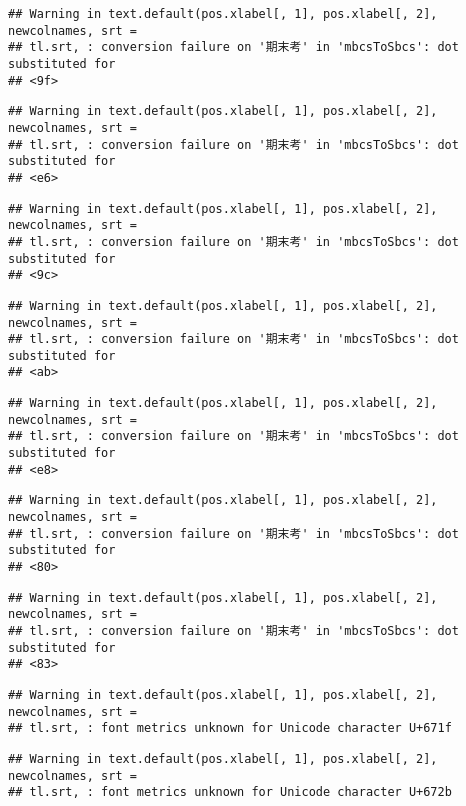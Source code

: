 \documentclass[
]{book}
\begin{document}
\begin{verbatim}
## Warning in text.default(pos.xlabel[, 1], pos.xlabel[, 2], newcolnames, srt =
## tl.srt, : conversion failure on '期末考' in 'mbcsToSbcs': dot substituted for
## <9f>
\end{verbatim}

\begin{verbatim}
## Warning in text.default(pos.xlabel[, 1], pos.xlabel[, 2], newcolnames, srt =
## tl.srt, : conversion failure on '期末考' in 'mbcsToSbcs': dot substituted for
## <e6>
\end{verbatim}

\begin{verbatim}
## Warning in text.default(pos.xlabel[, 1], pos.xlabel[, 2], newcolnames, srt =
## tl.srt, : conversion failure on '期末考' in 'mbcsToSbcs': dot substituted for
## <9c>
\end{verbatim}

\begin{verbatim}
## Warning in text.default(pos.xlabel[, 1], pos.xlabel[, 2], newcolnames, srt =
## tl.srt, : conversion failure on '期末考' in 'mbcsToSbcs': dot substituted for
## <ab>
\end{verbatim}

\begin{verbatim}
## Warning in text.default(pos.xlabel[, 1], pos.xlabel[, 2], newcolnames, srt =
## tl.srt, : conversion failure on '期末考' in 'mbcsToSbcs': dot substituted for
## <e8>
\end{verbatim}

\begin{verbatim}
## Warning in text.default(pos.xlabel[, 1], pos.xlabel[, 2], newcolnames, srt =
## tl.srt, : conversion failure on '期末考' in 'mbcsToSbcs': dot substituted for
## <80>
\end{verbatim}

\begin{verbatim}
## Warning in text.default(pos.xlabel[, 1], pos.xlabel[, 2], newcolnames, srt =
## tl.srt, : conversion failure on '期末考' in 'mbcsToSbcs': dot substituted for
## <83>
\end{verbatim}

\begin{verbatim}
## Warning in text.default(pos.xlabel[, 1], pos.xlabel[, 2], newcolnames, srt =
## tl.srt, : font metrics unknown for Unicode character U+671f
\end{verbatim}

\begin{verbatim}
## Warning in text.default(pos.xlabel[, 1], pos.xlabel[, 2], newcolnames, srt =
## tl.srt, : font metrics unknown for Unicode character U+672b
\end{verbatim}
\end{document}
